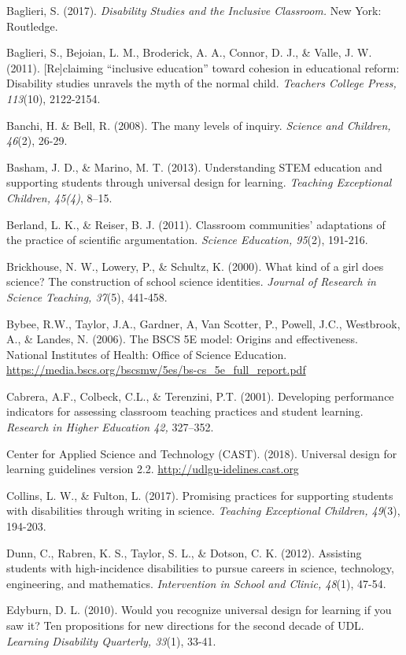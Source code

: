 \documentclass[11.5pt]{sig-alternate}
\begin{document}
Baglieri, S. (2017). \textit{Disability Studies and the Inclusive Classroom.} New York: Routledge.

Baglieri, S., Bejoian, L. M., Broderick, A. A., Connor, D. J., \& Valle, J. W. (2011). [Re]claiming “inclusive education” toward cohesion in educational reform: Disability studies unravels the myth of the normal child. \textit{Teachers College Press, 113}(10), 2122-2154.

Banchi, H. \& Bell, R. (2008). The many levels of inquiry. \textit{Science and Children, 46}(2), 26-29.

Basham, J. D., \& Marino, M. T. (2013). Understanding STEM education and supporting students through universal design for learning. \textit{Teaching Exceptional Children, 45(4)}, 8–15.

Berland, L. K., \& Reiser, B. J. (2011). Classroom communities' adaptations of the practice of scientific argumentation. \textit{Science Education, 95}(2), 191-216.

Brickhouse, N. W., Lowery, P., \& Schultz, K. (2000). What kind of a girl does science? The construction of school science identities. \textit{Journal of Research in Science Teaching, 37}(5), 441-458.

Bybee, R.W., Taylor, J.A., Gardner, A, Van Scotter, P., Powell, J.C., Westbrook, A., \& Landes, N. (2006). The BSCS 5E model: Origins and effectiveness. National Institutes of Health: Office of Science Education. \url{https://media.bscs.org/bscsmw/5es/bs-cs\_5e\_full\_report.pdf}

Cabrera, A.F., Colbeck, C.L., \& Terenzini, P.T. (2001). Developing performance indicators for assessing classroom teaching practices and student learning. \textit{Research in Higher Education 42,} 327–352.

Center for Applied Science and Technology (CAST). (2018). Universal design for learning guidelines version 2.2. \url{http://udlgu-idelines.cast.org}

Collins, L. W., \& Fulton, L. (2017). Promising practices for supporting students with disabilities through writing in science. \textit{Teaching Exceptional Children, 49}(3), 194-203.

Dunn, C., Rabren, K. S., Taylor, S. L., \& Dotson, C. K. (2012). Assisting students with high-incidence disabilities to pursue careers in science, technology, engineering, and mathematics. \textit{Intervention in School and Clinic, 48}(1), 47-54.

Edyburn, D. L. (2010). Would you recognize universal design for learning if you saw it? Ten propositions for new directions for the second decade of UDL. \textit{Learning Disability Quarterly, 33}(1), 33-41.
\end{document}
